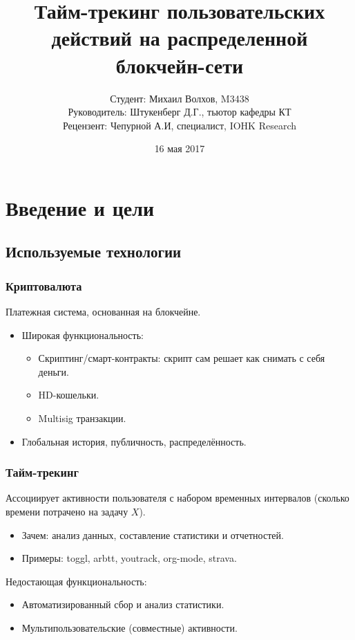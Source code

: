 \documentclass[11pt,handout,pdf,hyperref={unicode}]{beamer}
\title[Тайм-трекинг на блокчейне]{Тайм-трекинг пользовательских действий на распределенной блокчейн-сети}
\begin{document}
\author[Михаил Волхов, M3438]{
  Студент: Михаил Волхов, M3438\\
  Руководитель: Штукенберг Д.Г., тьютор кафедры КТ \\
  Рецензент: Чепурной А.И, специалист, IOHK Research
}
\date{16 мая 2017}

\frame{\titlepage}

\section{Введение и цели}

\subsection{Используемые технологии}

\begin{frame}
  \frametitle{Криптовалюта}

  Платежная система, основанная на блокчейне.
  \begin{itemize}
  \item Широкая функциональность:
  \begin{itemize}
    \item Скриптинг/смарт-контракты: скрипт сам решает как
      снимать с себя деньги.
    \item HD-кошельки.
    \item Multisig транзакции.
  \end{itemize}
  \item Глобальная история, публичность, распределённость.
  \end{itemize}
\end{frame}

\begin{frame}[fragile]
  \frametitle{Тайм-трекинг}

  Ассоциирует активности пользователя с набором временных интервалов
  (сколько времени потрачено на задачу $X$).

  \begin{itemize}
  \item Зачем: анализ данных, составление статистики и отчетностей.
  \item Примеры: toggl, arbtt, youtrack, org-mode, strava.
  \end{itemize}

  Недостающая функциональность:
  \begin{itemize}
  \item Автоматизированный сбор и анализ статистики.
  \item Мультипользовательские (совместные) активности.
  \end{itemize}

\end{frame}
\end{document}
